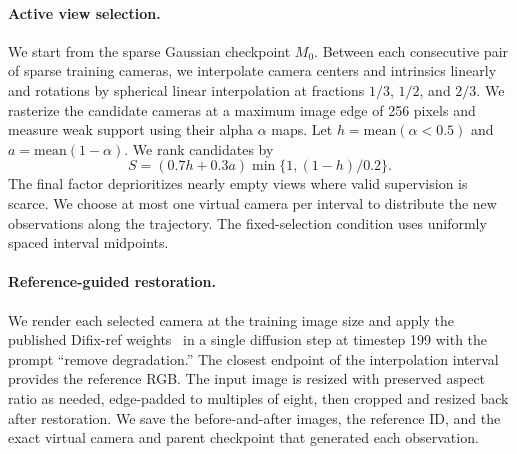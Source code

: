 \paragraph{Active view selection.}
We start from the sparse Gaussian checkpoint $M_0$. Between each consecutive pair of sparse training cameras, we interpolate camera centers and intrinsics linearly and rotations by spherical linear interpolation at fractions $1/3$, $1/2$, and $2/3$. We rasterize the candidate cameras at a maximum image edge of 256 pixels and measure weak support using their alpha $\alpha$ maps. Let $h=\mathrm{mean}(\alpha<0.5)$ and $a=\mathrm{mean}(1-\alpha)$. We rank candidates by
\begin{equation}
  S = (0.7h+0.3a)\min\{1,(1-h)/0.2\}.
  \label{eq:view_score}
\end{equation}
The final factor deprioritizes nearly empty views where valid supervision is scarce. We choose at most one virtual camera per interval to distribute the new observations along the trajectory. The fixed-selection condition uses uniformly spaced interval midpoints.

\paragraph{Reference-guided restoration.}
We render each selected camera at the training image size and apply the published Difix-ref weights~\cite{wu2025difix} in a single diffusion step at timestep 199 with the prompt ``remove degradation.'' The closest endpoint of the interpolation interval provides the reference RGB. The input image is resized with preserved aspect ratio as needed, edge-padded to multiples of eight, then cropped and resized back after restoration. We save the before-and-after images, the reference ID, and the exact virtual camera and parent checkpoint that generated each observation.

